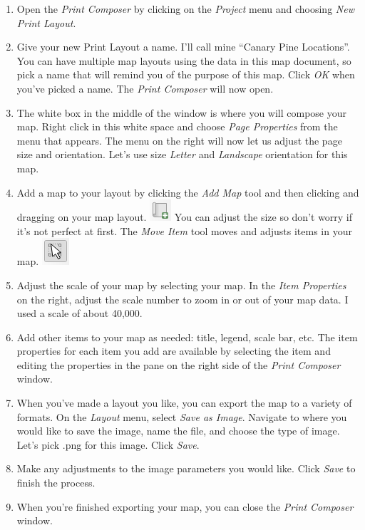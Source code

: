 \documentclass[
]{article}
\providecommand{\tightlist}{%
  \setlength{\itemsep}{0pt}\setlength{\parskip}{0pt}}
\begin{document}
\begin{enumerate}
\def\labelenumi{\arabic{enumi}.}
\tightlist
\item
  Open the \emph{Print Composer} by clicking on the \emph{Project} menu and choosing \emph{New Print Layout}.
\item
  Give your new Print Layout a name. I'll call mine ``Canary Pine Locations''. You can have multiple map layouts using the data in this map document, so pick a name that will remind you of the purpose of this map. Click \emph{OK} when you've picked a name. The \emph{Print Composer} will now open.
\item
  The white box in the middle of the window is where you will compose your map. Right click in this white space and choose \emph{Page Properties} from the menu that appears. The menu on the right will now let us adjust the page size and orientation. Let's use size \emph{Letter} and \emph{Landscape} orientation for this map.\\
\item
  Add a map to your layout by clicking the \emph{Add Map} tool and then clicking and dragging on your map layout. \includegraphics{./images/Tool_AddMap.PNG} You can adjust the size so don't worry if it's not perfect at first. The \emph{Move Item} tool moves and adjusts items in your map. \includegraphics{./images/Tool_MoveItem.PNG}
\item
  Adjust the scale of your map by selecting your map. In the \emph{Item Properties} on the right, adjust the scale number to zoom in or out of your map data. I used a scale of about 40,000.
\item
  Add other items to your map as needed: title, legend, scale bar, etc. The item properties for each item you add are available by selecting the item and editing the properties in the pane on the right side of the \emph{Print Composer} window.
\item
  When you've made a layout you like, you can export the map to a variety of formats. On the \emph{Layout} menu, select \emph{Save as Image}. Navigate to where you would like to save the image, name the file, and choose the type of image. Let's pick .png for this image. Click \emph{Save}.
\item
  Make any adjustments to the image parameters you would like. Click \emph{Save} to finish the process.
\item
  When you're finished exporting your map, you can close the \emph{Print Composer} window.
\end{enumerate}
\end{document}
